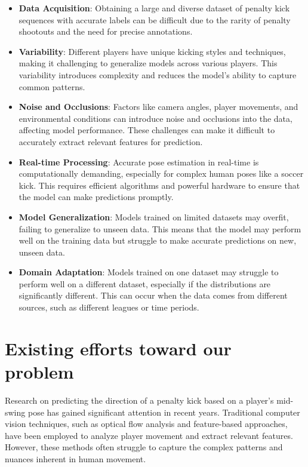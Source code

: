 \documentclass{article}
\begin{document}
\begin{itemize}
    \item {\bf Data Acquisition}: Obtaining a large and diverse dataset of penalty kick sequences with accurate labels can be difficult due to the rarity of penalty shootouts and the need for precise annotations.
    \item {\bf Variability}: Different players have unique kicking styles and techniques, making it challenging to generalize models across various players. This variability introduces complexity and reduces the model's ability to capture common patterns.
    \item {\bf Noise and Occlusions}: Factors like camera angles, player movements, and environmental conditions can introduce noise and occlusions into the data, affecting model performance. These challenges can make it difficult to accurately extract relevant features for prediction.
    \item {\bf Real-time Processing}: Accurate pose estimation in real-time is computationally demanding, especially for complex human poses like a soccer kick. This requires efficient algorithms and powerful hardware to ensure that the model can make predictions promptly.
    \item {\bf Model Generalization}: Models trained on limited datasets may overfit, failing to generalize to unseen data. This means that the model may perform well on the training data but struggle to make accurate predictions on new, unseen data.
    \item {\bf Domain Adaptation}: Models trained on one dataset may struggle to perform well on a different dataset, especially if the distributions are significantly different. This can occur when the data comes from different sources, such as different leagues or time periods.
\end{itemize}



\section{Existing efforts toward our problem}

Research on predicting the direction of a penalty kick based on a player's mid-swing pose has gained significant attention in recent years. Traditional computer vision techniques, such as optical flow analysis and feature-based approaches, have been employed to analyze player movement and extract relevant features. However, these methods often struggle to capture the complex patterns and nuances inherent in human movement.
\end{document}
